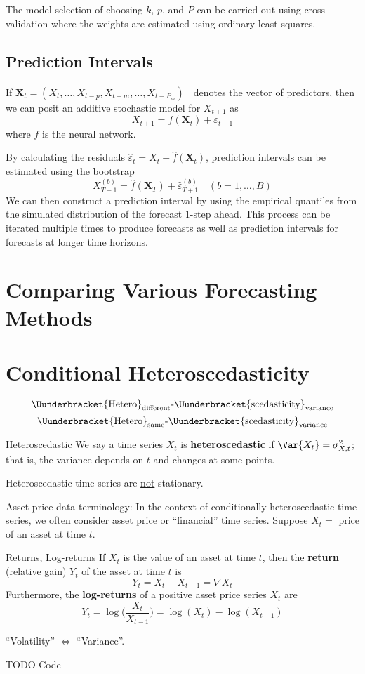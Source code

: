 The model selection of choosing $ k $, $ p $, and $ P $
can be carried out using cross-validation where the weights are estimated using ordinary
least squares.

\subsection*{Prediction Intervals}
If $ \symbf{X}_t=(X_t,\ldots,X_{t-p},X_{t-m},\ldots,X_{t-P_m})^\top $
denotes the vector of predictors, then we can posit an additive stochastic model for
$ X_{t+1} $ as
\[ X_{t+1}=f(\symbf{X}_t)+\varepsilon_{t+1} \]
where $ f $ is the neural network.

By calculating the residuals
$ \hat{\varepsilon}_t=X_t-\hat{f}(\symbf{X}_t) $,
prediction intervals can be estimated using the bootstrap
\[ X_{T+1}^{(b)}=\hat{f}(\symbf{X}_T)+\hat{\varepsilon}_{T+1}^{(b)}\quad(b=1,\ldots,B) \]
We can then construct a prediction interval by using
the empirical quantiles from the simulated distribution of the
forecast $ 1 $-step ahead. This process can be iterated multiple
times to produce forecasts as well as prediction intervals for
forecasts at longer time horizons.

\section{Comparing Various Forecasting Methods}

\section{Conditional Heteroscedasticity}
\[ \Uunderbracket{\text{Hetero}}_{\text{different}}\text{-}\Uunderbracket{\text{scedasticity}}_{\text{variance}} \]
\[ \Uunderbracket{\text{Hetero}}_{\text{same}}\text{-}\Uunderbracket{\text{scedasticity}}_{\text{variance}} \]
\begin{Definition}{Heteroscedastic}{}
    We say a time series $ X_t $ is \textbf{heteroscedastic}
    if $ \Var{X_t}=\sigma_{X,t}^2 $; that is, the variance
    depends on $ t $ and changes at some points.
\end{Definition}
\begin{Remark}{}{}
    Heteroscedastic time series are \underline{not} stationary.
\end{Remark}
Asset price data terminology: In the context of conditionally
heteroscedastic time series, we often consider asset price or ``financial''
time series. Suppose $ X_t= $ price of an asset at time $ t $.
\begin{Definition}{Returns, Log-returns}{}
    If $ X_t $ is the value of an asset at time $ t $, then
    the \textbf{return} (relative gain) $ Y_t $ of the
    asset at time $ t $ is
    \[ Y_t=X_t-X_{t-1}=\nabla X_t \]
    Furthermore, the \textbf{log-returns}
    of a positive asset price series $ X_t $
    are
    \[ Y_t=\log\biggl(\frac{X_t}{X_{t-1}} \biggr)=\log(X_t)-\log(X_{t-1}) \]
\end{Definition}
\begin{Remark}{}{}
    ``Volatility'' $ \iff $ ``Variance''.
\end{Remark}
TODO Code

